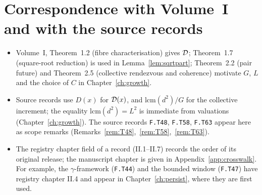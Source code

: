 \section{Correspondence with Volume~I and with the source records}

\begin{itemize}[nosep]
\item Volume~I, Theorem~1.2 (fibre characterisation) gives \(\mathcal{D}\); Theorem~1.7 (square-root reduction) is used in Lemma~\ref{lem:sqrtpart}; Theorem~2.2 (pair future) and Theorem~2.5 (collective rendezvous and coherence) motivate \(G\), \(L\) and the choice of \(C\) in Chapter~\ref{ch:growth}.
\item Source records use \(D(x)\) for \(\mathcal{D}(x)\), and \(\mathrm{lcm}(d^2)/G\) for the collective increment; the equality \(\mathrm{lcm}(d^2)=L^2\) is immediate from valuations (Chapter~\ref{ch:growth}). The source records \texttt{F.T48}, \texttt{F.T58}, \texttt{F.T63} appear here as scope remarks (Remarks~\ref{rem:T48},~\ref{rem:T58},~\ref{rem:T63}).
\item The registry chapter field of a record (II.1--II.7) records the order of its original release; the manuscript chapter is given in Appendix~\ref{app:crosswalk}. For example, the \(\gamma\)-framework (\texttt{F.T44}) and the bounded window (\texttt{F.T47}) have registry chapter II.4 and appear in Chapter~\ref{ch:persist}, where they are first used.
\end{itemize}
